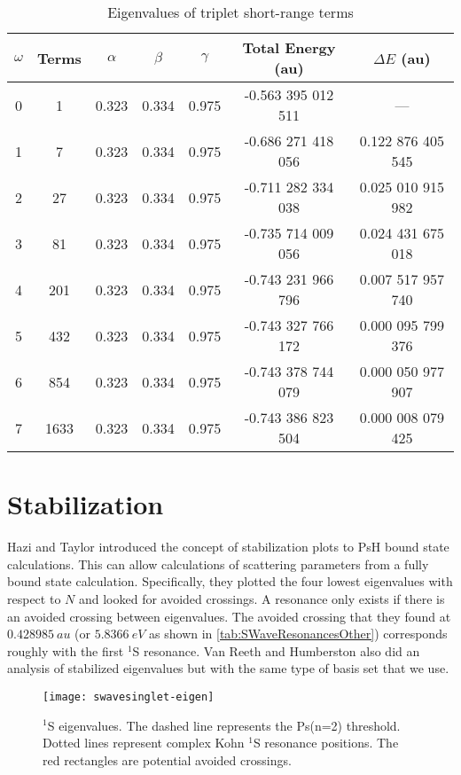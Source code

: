 \documentclass[Dissertation.tex]{subfiles}
\begin{document}
\setlength{\abovecaptionskip}{6pt}   %
\setlength{\belowcaptionskip}{6pt}   %
\begin{table}[H]
\centering
\begin{tabular}{c c c c c c c}
\toprule
$\omega$ & Terms & $\alpha$ & $\beta$ & $\gamma$ & Total Energy (au) & $\Delta E$ (au) \\ [0.5ex]
\midrule
0 & 1    & 0.323 & 0.334 & 0.975 & -0.563 395 012 511 & --- \\
1 & 7    & 0.323 & 0.334 & 0.975 & -0.686 271 418 056 & 0.122 876 405 545 \\
2 & 27   & 0.323 & 0.334 & 0.975 & -0.711 282 334 038 & 0.025 010 915 982 \\
3 & 81   & 0.323 & 0.334 & 0.975 & -0.735 714 009 056 & 0.024 431 675 018 \\
4 & 201  & 0.323 & 0.334 & 0.975 & -0.743 231 966 796 & 0.007 517 957 740 \\
5 & 432  & 0.323 & 0.334 & 0.975 & -0.743 327 766 172 & 0.000 095 799 376 \\
6 & 854  & 0.323 & 0.334 & 0.975 & -0.743 378 744 079 & 0.000 050 977 907 \\
7 & 1633 & 0.323 & 0.334 & 0.975 & -0.743 386 823 504 & 0.000 008 079 425 \\
\bottomrule
\end{tabular}
\caption{Eigenvalues of triplet short-range terms}
\label{tab:BoundEnergyTodd3}
\end{table}


\section{Stabilization}

Hazi and Taylor \cite{Hazi1970} introduced the concept of stabilization plots 
to PsH bound state calculations. This can allow calculations of scattering 
parameters from a fully bound state calculation. Specifically, they plotted 
the four lowest eigenvalues with respect to $N$ and looked for avoided 
crossings. A resonance only exists if there is an avoided crossing between 
eigenvalues. The avoided crossing that they found at $\SI{0.428 985}{au}$ (or 
$\SI{5.8366}{eV}$ as shown in \cref{tab:SWaveResonancesOther}) corresponds 
roughly with the first $^1$S resonance. Van Reeth and Humberston \cite{
VanReeth2004} also did an analysis of stabilized eigenvalues but with the 
same type of basis set that we use.

\begin{figure}[H]
	\centering
	\texttt{[image: swavesinglet-eigen]}
	\caption[$^1$S eigenvalues]{$^1$S eigenvalues. The dashed line represents the Ps(n=2) threshold. Dotted lines represent complex Kohn $^1$S resonance positions. The red rectangles are potential avoided crossings.}
	\label{fig:swavesinglet-eigen}
\end{figure}
\end{document}
